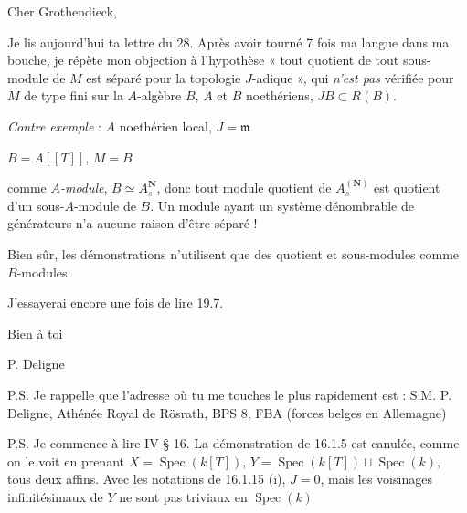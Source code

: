\documentclass[11pt,a4paper]{article}
\begin{document}
Cher Grothendieck,

Je lis aujourd'hui ta lettre du 28. Après avoir tourné 7 fois ma langue dans
ma bouche, je répète mon objection à l'hypothèse « tout quotient de tout
sous-module de $M$ est séparé pour la topologie $J$-adique », qui
\emph{n'est pas}  vérifiée pour $M$ de type fini sur la
$A$-algèbre $B$, $A$ et $B$ noethériens, $JB \subset R(B)$.

\emph{Contre exemple} : $A$ noethérien local, $J = \mathfrak{m}$

$B = A[[T]]$, $M = B$

comme \emph{$A$-module}, $B \simeq A_s^{\mathbf{N}}$, donc tout module
quotient de $A_s^{(\mathbf{N})}$ est quotient d'un sous-$A$-module de $B$.
 Un module ayant un système dénombrable de générateurs n'a aucune
raison d'être séparé !

Bien sûr, les démonstrations  n'utilisent que des quotient et
sous-modules comme $B$-modules.

J'essayerai encore une fois de lire 19.7.

Bien à toi

P. Deligne

P.S. Je rappelle que l'adresse où tu me touches le plus rapidement est :
S.M. P. Deligne, Athénée Royal de Rösrath, BPS 8, FBA (forces belges en
Allemagne)

P.S. Je commence à lire IV § 16. La démonstration de 16.1.5 est canulée,
comme on le voit en prenant $X = \operatorname{Spec}(k[T])$,
$Y = \operatorname{Spec}(k[T]) \sqcup \operatorname{Spec}(k)$, tous deux
affins.
Avec les notations de 16.1.15 (i), $J = 0$, mais les voisinages
infinitésimaux de $Y$ ne sont pas \struck{\ill{}} triviaux en
$\operatorname{Spec}(k)$
\end{document}
